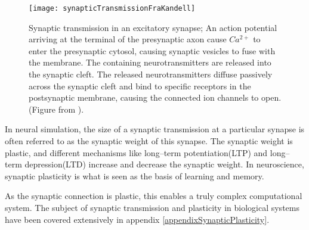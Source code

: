 \begin{figure}[hbt!p]
    \centering
    \texttt{[image: synapticTransmissionFraKandell]}	%
 	  \caption[Synaptic transmission in an excitatory synapse]
			{Synaptic transmission in an excitatory synapse; 
			An action potential arriving at the terminal of the presynaptic axon cause $Ca^{2+}$ to enter the presynaptic cytosol, causing synaptic vesicles to fuse with the membrane.
			The containing neurotransmitters are released into the synaptic cleft.
			The released neurotransmitters diffuse passively across the synaptic cleft and bind to specific receptors in the postsynaptic membrane, causing the connected ion channels to open.
			(Figure from \cite{PrinciplesOfNeuralScience4edKAP10}).
			}
    \label{figActionPotential}
\end{figure}

		In neural simulation, the size of a synaptic transmission at a particular synapse is often referred to as the synaptic weight of this synapse.
		The synaptic weight is plastic, and different mechanisms like long--term potentiation(LTP) and long--term depression(LTD) increase and decrease the synaptic weight.
		In neuroscience, synaptic plasticity is what is seen as the basis of learning and memory\cite{NeuroscienceExploringTheBrain3edKAP25}. %

		As the synaptic connection is plastic, this enables a truly complex computational system.
		The subject of synaptic transmission and plasticity in biological systems have been covered extensively in appendix \ref{appendixSynapticPlasticity}.



